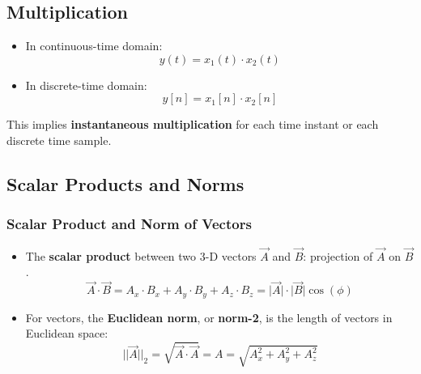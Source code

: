 \documentclass[12pt,a4paper]{article}
\begin{document}
\subsection{Multiplication} 
\begin{itemize}
\item In continuous-time domain: 
\[ y(t) = x_{1}(t) \cdot x_{2}(t) \]
\item In discrete-time domain:
\[ y[n] = x_{1}[n] \cdot x_{2}[n] \]
\end{itemize}
This implies \textbf{instantaneous multiplication} for each time instant or each discrete time sample.
\subsection{Scalar Products and Norms}
\subsubsection{Scalar Product and Norm of Vectors}
\begin{itemize}
\item The \textbf{scalar product} between two 3-D vectors $\vec{A}$ and $\vec{B}$: projection of $\vec{A}$ on $\vec{B}$.
\[ \vec{A} \cdot \vec{B} = A_{x} \cdot B_{x} + A_{y} \cdot B_{y} + A_{z} \cdot B_{z} = \lvert \vec{A} \rvert \cdot \lvert \vec{B} \lvert \cos(\phi) \]
 \item For vectors, the \textbf{Euclidean norm}, or \textbf{norm-2}, is the length of vectors in Euclidean space:
 \[ \lvert \lvert \vec{A} \rvert \rvert_{2} = \sqrt{\vec{A} \cdot \vec{A}} = A = \sqrt{A_{x}^2+A_{y}^2+A_{z}^2} \]
 \end{itemize}
\end{document}
